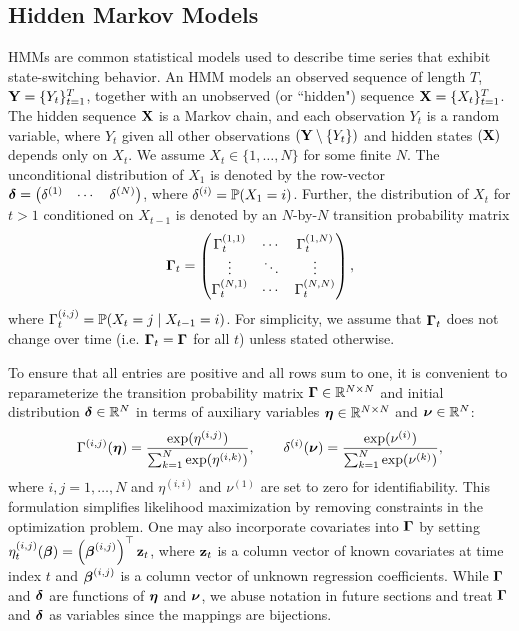 \subsection{Hidden Markov Models}

HMMs are common statistical models used to describe time series that exhibit state-switching behavior. An HMM models an observed sequence of length $T$, $\mathbf{Y} = \{Y_t\}_{t=1}^T$, together with an unobserved (or  ``hidden") sequence $\mathbf{X} = \{X_t\}_{t=1}^T$. The hidden sequence $\mathbf{X}$ is a Markov chain, and each observation $Y_t$ is a random variable, where $Y_t$ given all other observations $(\mathbf{Y} \setminus \{Y_t\})$ and hidden states $(\mathbf{X})$ depends only on $X_t$. We assume $X_t \in \{1,\ldots,N\}$ for some finite $N$. The unconditional distribution of $X_1$ is denoted by the row-vector $\boldsymbol{\delta} = \begin{pmatrix} \delta^{(1)} & \cdots & \delta^{(N)} \end{pmatrix}$, where $\delta^{(i)} = \mathbb{P}(X_1 = i)$. Further, the distribution of $X_t$ for $t > 1$ conditioned on $X_{t-1}$ is denoted by an $N$-by-$N$ transition probability matrix 
%
\begin{equation}
    \boldsymbol{\Gamma}_t = \begin{pmatrix} 
    \Gamma_t^{(1,1)} & \cdots & \Gamma_t^{(1,N)} \\
    \vdots & \ddots & \vdots \\
    \Gamma_t^{(N,1)} & \cdots & \Gamma_t^{(N,N)} \\
    \end{pmatrix},
\end{equation}
%
where $\Gamma_t^{(i,j)} = \mathbb{P}(X_t = j \mid X_{t-1} = i)$. For simplicity, we assume that $\boldsymbol{\Gamma}_t$ does not change over time (i.e. $\boldsymbol{\Gamma}_t = \boldsymbol{\Gamma}$ for all $t$) unless stated otherwise. 

To ensure that all entries are positive and all rows sum to one, it is convenient to reparameterize the transition probability matrix $\boldsymbol{\Gamma} \in \mathbb{R}^{N \times N}$ and initial distribution $\boldsymbol{\delta} \in \mathbb{R}^N$ in terms of auxiliary variables $\boldsymbol{\eta} \in \mathbb{R}^{N \times N}$ and $\boldsymbol{\nu} \in \mathbb{R}^N$:
%
\begin{equation}
    \Gamma^{(i,j)}(\boldsymbol{\eta}) = \frac{\exp(\eta^{(i,j)})}{\sum_{k=1}^N \exp(\eta^{(i,k)})}, \qquad \delta^{(i)}(\boldsymbol{\nu}) = \frac{\exp(\nu^{(i)})}{\sum_{k=1}^N \exp(\nu^{(k)})},
    \label{eqn:reparam}
\end{equation}
%
where $i,j = 1,\ldots,N$ and $\eta^{(i,i)}$ and $\nu^{(1)}$ are set to zero for identifiability. This formulation simplifies likelihood maximization by removing constraints in the optimization problem. One may also incorporate covariates into $\boldsymbol{\Gamma}$ by setting $\eta_t^{(i,j)}(\boldsymbol{\beta}) = \left(\boldsymbol{\beta}^{(i,j)}\right)^{\top} \mathbf{z}_t$, where $\mathbf{z}_t$ is a column vector of known covariates at time index $t$ and $\boldsymbol{\beta}^{(i,j)}$ is a column vector of unknown regression coefficients. While $\boldsymbol{\Gamma}$ and $\boldsymbol{\delta}$ are functions of $\boldsymbol{\eta}$ and $\boldsymbol{\nu}$, we abuse notation in future sections and treat $\boldsymbol{\Gamma}$ and $\boldsymbol{\delta}$ as variables since the mappings are bijections.

